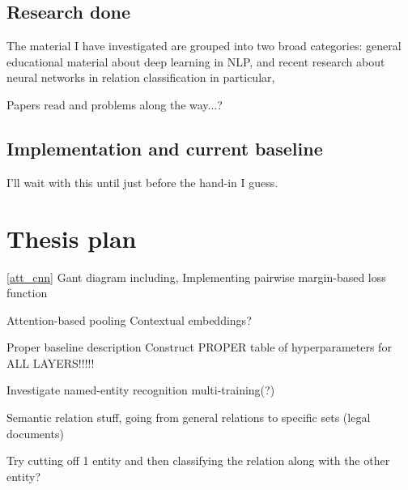 \documentclass{article}
\begin{document}
\subsection{Research done}

The material I have investigated are grouped into two broad categories: general educational material about deep learning in NLP, and recent research about neural networks in relation classification in particular,  


Papers read and problems along the way...?


\subsection{Implementation and current baseline}

I'll wait with this until just before the hand-in I guess.


\section{Thesis plan}

\ref{att_cnn}
\cite{att_cnn}
Gant diagram including,
Implementing pairwise margin-based loss function

Attention-based pooling
Contextual embeddings?

Proper baseline description
Construct PROPER table of hyperparameters for ALL LAYERS!!!!!

Investigate named-entity recognition multi-training(?)

Semantic relation stuff, going from general relations to specific
sets (legal documents)

Try cutting off 1 entity and then classifying the relation along with the other entity?






    
\end{document}
